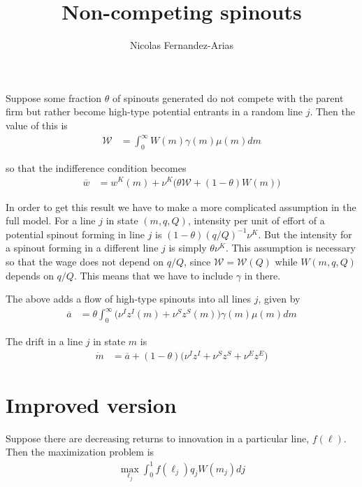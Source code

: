 \documentclass[12pt,english]{article}
\theoremstyle{remark}
\begin{document}
	

\title{Non-competing spinouts}
\author{Nicolas Fernandez-Arias}
\maketitle

Suppose some fraction $\theta$ of spinouts generated do not compete with the parent firm but rather become high-type potential entrants in a random line $j$. Then the value of this is
\begin{align*}
	\mathcal{W} &= \int_0^{\infty} W(m) \gamma(m) \mu(m)dm
\end{align*}

so that the indifference condition becomes
\begin{align*}
	\overline{w} &= w^K(m) + \nu^K \Big( \theta \mathcal{W} + (1-\theta) W(m) \Big)
\end{align*}

In order to get this result we have to make a more complicated assumption in the full model. For a line $j$ in state $(m,q,Q)$, intensity per unit of effort of a potential spinout forming in line $j$ is $(1-\theta) (q/Q)^{-1} \nu^K$. But the intensity for a spinout forming in a different line $j$ is simply $\theta \nu^K$. This assumption is necessary so that the wage does not depend on $q/Q$, since $\mathcal{W} = \mathcal{W}(Q)$ while $W(m,q,Q)$ depends on $q/Q$. This means that we have to include $\gamma$ in there. 

The above adds a flow of high-type spinouts into all lines $j$, given by
\begin{align*}
	\overline{a} &= \theta \int_0^{\infty} \Big( \nu^I z^I(m) + \nu^S z^S(m) \Big) \gamma(m) \mu(m) dm 
\end{align*}

The drift in a line $j$ in state $m$ is
\begin{align*}
	\dot{m} &= \overline{a} + (1-\theta) \Big(\nu^I z^I + \nu^S z^S + \nu^E z^E \Big) 
\end{align*}

\section{Improved version}

Suppose there are decreasing returns to innovation in a particular line, $f(\ell)$. Then the maximization problem is
\begin{align*}
	\max_{\ell_j} \int_0^1 f(\ell_j) q_j W(m_j) dj 
\end{align*}
\end{document}
